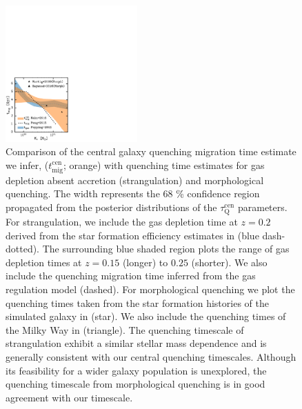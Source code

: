 \documentclass[iop,apj,tighten,twocolappendix,numberedappendix]{emulateapj}
\newcommand{\taucen}{\tau_\mathrm{Q}^\mathrm{cen}}
\begin{document}
\begin{figure}
\begin{center}
\includegraphics[width=0.45\textwidth]{figs/t_quenching_comparison_z0_2.pdf}
\caption{
Comparison of the central galaxy quenching migration time 
estimate we infer, ($t_\mathrm{mig}^\mathrm{cen}$; orange) with 
quenching time estimates for gas depletion absent accretion (strangulation)
and morphological quenching. The width represents the 68 \% 
confidence region propagated from the posterior distributions of the 
$\taucen$ parameters. 
For strangulation, we include the gas depletion time at $z = 0.2$ derived 
from the star formation efficiency estimates in \cite{Popping:2015aa} 
(blue dash-dotted). The surrounding blue shaded region plots the range 
of gas depletion times at $z = 0.15$ (longer) to $0.25$ (shorter). 
We also include the quenching migration time inferred from 
the \cite{Peng:2015aa} gas regulation model (dashed). 
For morphological quenching we plot the quenching times taken from 
the star formation histories of the simulated galaxy in 
\cite{Martig:2009aa} (star). We also include the quenching times 
of the Milky Way in \cite{Haywood:2016aa} (triangle). 
The quenching timescale of strangulation exhibit a similar
stellar mass dependence and is generally consistent with our central 
quenching timescales. Although its feasibility 
for a wider galaxy population is unexplored, the quenching timescale
from morphological quenching is in good agreement with our timescale.}
\label{fig:tquench_comp}
\end{center}
\end{figure}
\end{document}
